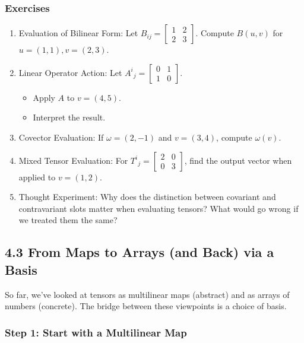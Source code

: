\documentclass[
  letterpaper,
  DIV=11,
  numbers=noendperiod]{scrreprt}
\providecommand{\tightlist}{%
  \setlength{\itemsep}{0pt}\setlength{\parskip}{0pt}}
\begin{document}
\subsubsection{Exercises}\label{exercises-13}

\begin{enumerate}
\def\labelenumi{\arabic{enumi}.}
\item
  Evaluation of Bilinear Form: Let
  \(B_{ij} = \begin{bmatrix}1 & 2 \\ 2 & 3\end{bmatrix}\). Compute
  \(B(u,v)\) for \(u=(1,1), v=(2,3)\).
\item
  Linear Operator Action: Let
  \(A^i{}_j = \begin{bmatrix}0 & 1 \\ 1 & 0\end{bmatrix}\).

  \begin{itemize}
  \tightlist
  \item
    Apply \(A\) to \(v=(4,5)\).
  \item
    Interpret the result.
  \end{itemize}
\item
  Covector Evaluation: If \(\omega = (2, -1)\) and \(v=(3,4)\), compute
  \(\omega(v)\).
\item
  Mixed Tensor Evaluation: For
  \(T^i{}_j = \begin{bmatrix}2 & 0 \\ 0 & 3\end{bmatrix}\), find the
  output vector when applied to \(v=(1,2)\).
\item
  Thought Experiment: Why does the distinction between covariant and
  contravariant slots matter when evaluating tensors? What would go
  wrong if we treated them the same?
\end{enumerate}

\subsection{4.3 From Maps to Arrays (and Back) via a
Basis}\label{from-maps-to-arrays-and-back-via-a-basis}

So far, we've looked at tensors as multilinear maps (abstract) and as
arrays of numbers (concrete). The bridge between these viewpoints is a
choice of basis.

\subsubsection{Step 1: Start with a Multilinear
Map}\label{step-1-start-with-a-multilinear-map}
\end{document}
